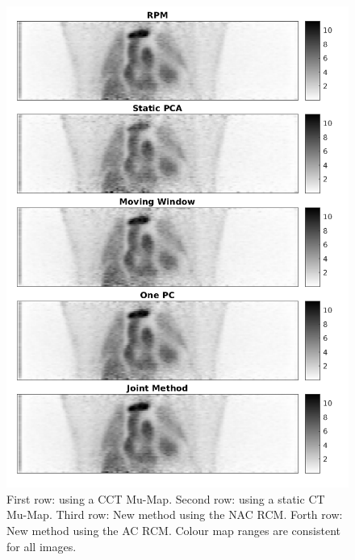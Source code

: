     \begin{figure}
        \centering
        \includegraphics[width=1.0\linewidth]{figures/visual_analysis_pca.png}
        \captionsetup{singlelinecheck=false, justification=centering}
        \caption{First row:  using a \gls{CCT} \gls{Mu-Map}. Second row:  using a static \gls{CT} \gls{Mu-Map}. Third row: New method using the \gls{NAC} \gls{RCM}. Forth row: New method using the \gls{AC} \gls{RCM}. Colour map ranges are consistent for all images.}
        \label{fig:visual_analysis}
    \end{figure}
    
